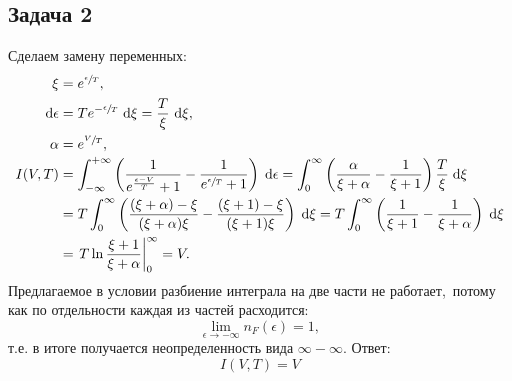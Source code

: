 \def \picdir{pic/}

\subsection*{Задача 2}
Сделаем замену переменных:
\begin{align*}
  \xi &= e^{\sfrac{\epsilon}{T}},\\
  \mathrm{d} \epsilon &= Te^{- \sfrac{\epsilon}{T}}\ \mathrm{d} \xi = \frac{T}{\xi}\ \mathrm{d} \xi,\\
  \alpha &= e^{\sfrac{V}{T}},\\
  I(V,T) &= \int_{-\infty}^{+\infty} \left(\frac{1}{e^{\frac{\epsilon-V}{T}} + 1} - \frac{1}{e^{\sfrac{\epsilon}{T}}+1} \right) \; \mathrm{d} \epsilon = \int_{0}^{\infty} \left(\frac{\alpha}{\xi + \alpha}- \frac{1}{\xi + 1} \right)\frac{T}{\xi} \; \mathrm{d} \xi\\
    &= T \int_{0}^{\infty} \left(\frac{(\xi + \alpha) - \xi}{(\xi + \alpha)\xi}- \frac{(\xi + 1) - \xi}{(\xi + 1)\xi} \right)\; \mathrm{d} \xi = T \int_{0}^{\infty} \left(\frac{1}{\xi + 1}- \frac{1}{\xi + \alpha} \right)\; \mathrm{d} \xi\\
    &= \left.T\ln{\frac{\xi + 1}{\xi + \alpha}}\right|_0^\infty = V.
\end{align*}
Предлагаемое в условии разбиение интеграла на две части не работает,\
потому как по отдельности каждая из частей расходится:
\begin{equation*}
  \lim_{\epsilon \rightarrow -\infty}n_F(\epsilon) = 1,
\end{equation*}
т.е. в итоге получается неопределенность вида $\infty - \infty$. Ответ:
\begin{equation*}
  \boxed{I(V,T) = V}
\end{equation*}